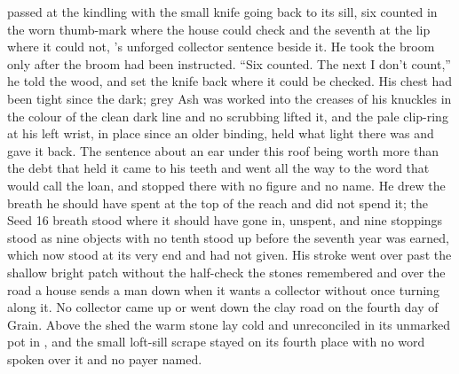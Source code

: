  passed at the kindling with the small knife going back to its sill, six counted in the worn thumb-mark where the house could check and the seventh at the lip where it could not, 's unforged collector sentence beside it. He took the broom only after the broom had been instructed. “Six counted. The next I don't count,” he told the wood, and set the knife back where it could be checked. His chest had been tight since the dark; grey Ash was worked into the creases of his knuckles in the colour of the clean dark line and no scrubbing lifted it, and the pale clip-ring at his left wrist, in place since an older binding, held what light there was and gave it back. The sentence about an ear under this roof being worth more than the debt that held it came to his teeth and went all the way to the word that would call the loan, and stopped there with no figure and no name. He drew the breath he should have spent at the top of the reach and did not spend it; the Seed 16 breath stood where it should have gone in, unspent, and nine stoppings stood as nine objects with no tenth stood up before the seventh year was earned, which now stood at its very end and had not given. His stroke went over  past the shallow bright patch without the half-check the stones remembered and over the road a house sends a man down when it wants a collector without once turning along it. No collector came up or went down the clay road on the fourth day of Grain. Above the shed the warm stone lay cold and unreconciled in its unmarked pot in , and the small loft-sill scrape stayed on its fourth place with no word spoken over it and no payer named.

